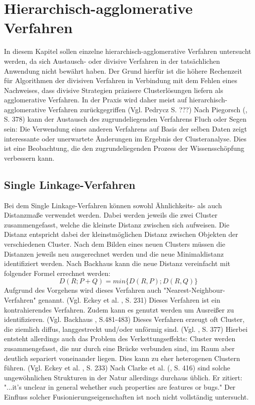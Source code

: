 \chapter{Hierarchisch-agglomerative Verfahren}

In diesem Kapitel sollen einzelne hierarchisch-agglomerative Verfahren untersucht werden, da sich Austausch- oder divisive Verfahren in der tatsächlichen Anwendung nicht bewährt haben. Der Grund hierfür ist die höhere Rechenzeit für Algorithmen der divisiven Verfahren in Verbindung mit dem Fehlen eines Nachweises, dass divisive Strategien präzisere Clusterlösungen liefern als agglomerative Verfahren. In der Praxis wird daher meist auf hierarchisch-agglomerative Verfahren zurückgegriffen (Vgl. Pedrycz \cite{Pedrycz.2010} S. ???)
Nach Piegorsch (\cite{Piegorsch.2015}, S. 378) kann der Austausch des zugrundeliegenden Verfahrens Fluch oder Segen sein: Die Verwendung eines anderen Verfahrens auf Basis der selben Daten zeigt interessante oder unerwartete Änderungen im Ergebnis der Clusteranalyse. Dies ist eine Beobachtung, die den zugrundeliegenden Prozess der Wissensschöpfung verbessern kann.

\section{Single Linkage-Verfahren}
Bei dem Single Linkage-Verfahren können sowohl Ähnlichkeits- als auch Distanzmaße verwendet werden. Dabei werden jeweils die zwei Cluster zusammengefasst, welche die kleinste Distanz zwischen sich aufweisen. Die Distanz entspricht dabei der kleinstmöglichen Distanz zwischen Objekten der verschiedenen Cluster. Nach dem Bilden eines neuen Clusters müssen die Distanzen jeweils neu ausgerechnet werden und die neue Minimaldistanz identifiziert werden.
Nach Backhaus \cite{Backhaus.2016} kann die neue Distanz vereinfacht mit folgender Formel errechnet werden:
\begin{equation}
D(R;P+Q) = min\{D(R,P);D(R,Q)\}
\end{equation}
Aufgrund des Vorgehens wird dieses Verfahren auch "Nearest-Neighbour-Verfahren" genannt. (Vgl. Eckey et al. \cite{Eckey.2002}, S. 231)
Dieses Verfahren ist ein kontrahierendes Verfahren. Zudem kann es genutzt werden um Ausreißer zu identifizieren. (Vgl. Backhaus \cite{Backhaus.2016}, S.481-483)
Dieses Verfahren erzeugt oft Cluster, die ziemlich diffus, langgestreckt und/oder unförmig sind. (Vgl. \cite{Piegorsch.2015}, S. 377)
Hierbei entsteht allerdings auch das Problem des Verkettungseffekts: Cluster werden zusammengefasst, die nur durch eine Brücke verbunden sind, im Raum aber deutlich separiert voneinander liegen. Dies kann zu eher heterogenen Clustern führen. (Vgl. Eckey et al. \cite{Eckey.2002}, S. 233)
Nach Clarke et al. (\cite{Clarke.2009}, S. 416) sind solche ungewöhnlichen Strukturen in der Natur allerdings durchaus üblich. Er zitiert: "...it's unclear in general wehether such properties are features or bugs." Der Einfluss solcher Fusionierungseigenschaften ist noch nicht vollständig untersucht.


